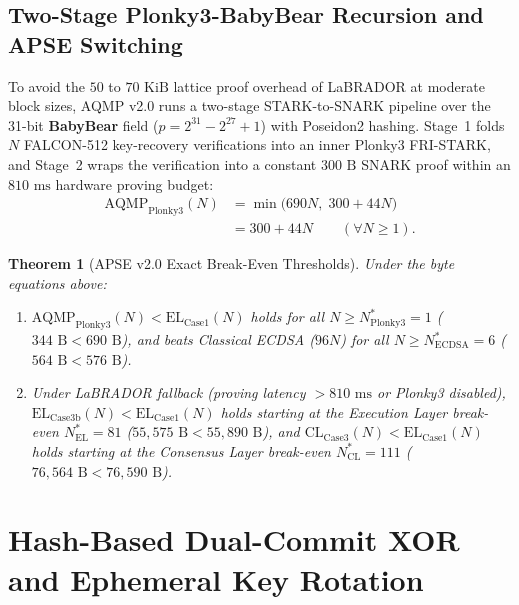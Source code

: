 \documentclass[conference,compsoc]{IEEEtran}
\newtheorem{theorem}{Theorem}
\begin{document}
\subsection{Two-Stage Plonky3-BabyBear Recursion and APSE Switching}
To avoid the $50$ to $70\text{ KiB}$ lattice proof overhead of LaBRADOR at moderate block sizes, AQMP v2.0 runs a two-stage STARK-to-SNARK pipeline over the 31-bit \textbf{BabyBear} field ($p = 2^{31} - 2^{27} + 1$) with Poseidon2 hashing. Stage~1 folds $N$ FALCON-512 key-recovery verifications into an inner Plonky3 FRI-STARK, and Stage~2 wraps the verification into a constant $300\text{ B}$ SNARK proof within an $810\text{ ms}$ hardware proving budget:
\begin{equation}
\label{eq:plonky3}
\begin{aligned}
\text{AQMP}_{\text{Plonky3}}(N)
  &= \min\!\Big(690N,\; 300 + 44N\Big) \\
  &= 300 + 44N \qquad (\forall N \ge 1).
\end{aligned}
\end{equation}

\begin{theorem}[APSE v2.0 Exact Break-Even Thresholds]
Under the byte equations above:
\begin{enumerate}
    \item $\text{AQMP}_{\text{Plonky3}}(N) < \text{EL}_{\text{Case1}}(N)$ holds for all $N \ge N^*_{\text{Plonky3}} = 1$ ($344\text{ B} < 690\text{ B}$), and beats Classical ECDSA ($96N$) for all $N \ge N^*_{\text{ECDSA}} = 6$ ($564\text{ B} < 576\text{ B}$).
    \item Under LaBRADOR fallback (proving latency $> 810\text{ ms}$ or Plonky3 disabled), $\text{EL}_{\text{Case3b}}(N) < \text{EL}_{\text{Case1}}(N)$ holds starting at the Execution Layer break-even $N^*_{\text{EL}} = 81$ ($55{,}575\text{ B} < 55{,}890\text{ B}$), and $\text{CL}_{\text{Case3}}(N) < \text{EL}_{\text{Case1}}(N)$ holds starting at the Consensus Layer break-even $N^*_{\text{CL}} = 111$ ($76{,}564\text{ B} < 76{,}590\text{ B}$).
\end{enumerate}
\end{theorem}

\section{Hash-Based Dual-Commit XOR and Ephemeral Key Rotation}
\label{sec:dualcommit}
\end{document}
